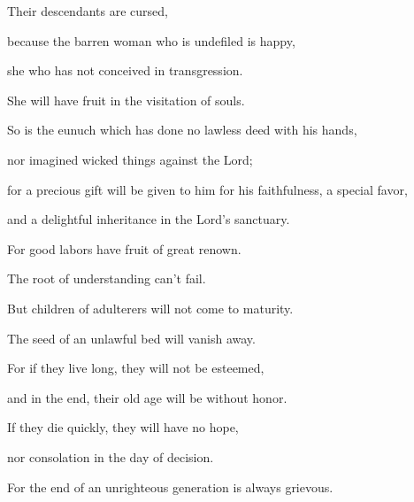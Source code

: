 {\par }{\QB {}Their descendants are cursed,
\par }{\QB because the barren woman who is undefiled is happy,
\par }{\QB she who has not conceived in transgression.
\par }{\QB She will have fruit in the visitation of souls.
\par }{\Q {}So is the eunuch which has done no lawless deed with his hands,
\par }{\QB nor imagined wicked things against the Lord;
\par }{\Q for a precious gift will be given to him for his faithfulness, a special favor,
\par }{\QB and a delightful inheritance in the Lord’s sanctuary.
\par }{\Q {}For good labors have fruit of great renown.
\par }{\QB The root of understanding can’t fail.
\par }{\Q {}But children of adulterers will not come to maturity.
\par }{\QB The seed of an unlawful bed will vanish away.
\par }{\Q {}For if they live long, they will not be esteemed,
\par }{\QB and in the end, their old age will be without honor.
\par }{\Q {}If they die quickly, they will have no hope,
\par }{\QB nor consolation in the day of decision.
\par }{\Q {}For the end of an unrighteous generation is always grievous.

}
